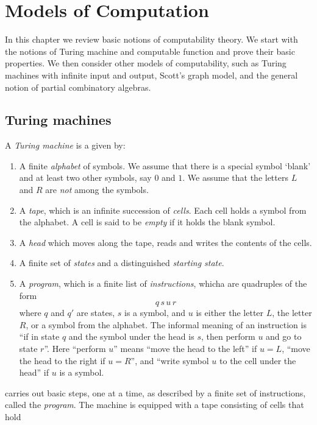 \chapter{Models of Computation\label{cha:models}}


In this chapter we review basic notions of computability theory. We
start with the notions of Turing machine and computable function and
prove their basic properties. We then consider other models of
computability, such as Turing machines with infinite input and output,
Scott's graph model, and the general notion of partial combinatory
algebras.


\section{Turing machines}
\label{sec:turing-machines}

A \emph{Turing machine} is a given by:
%
\begin{enumerate}
\item A finite \emph{alphabet} of symbols. We assume that there is a
  special symbol `blank' and at least two other symbols, say $0$ and
  $1$. We assume that the letters $L$ and $R$ are \emph{not} among the
  symbols.
\item A \emph{tape}, which is an infinite succession of \emph{cells}.
  Each cell holds a symbol from the alphabet. A cell is said to be
  \emph{empty} if it holds the blank symbol.
\item A \emph{head} which moves along the tape, reads and writes
  the contents of the cells.
\item A finite set of \emph{states} and a distinguished \emph{starting
    state}.
\item A \emph{program}, which is a finite list of \emph{instructions},
  whicha are quadruples of the form
  \begin{equation*}
    q \, s \, u \, r
  \end{equation*}
  where $q$ and $q'$ are states, $s$ is a symbol, and $u$ is either
  the letter $L$, the letter $R$, or a symbol from the alphabet. The
  informal meaning of an instruction is ``if in state $q$ and the
  symbol under the head is $s$, then perform $u$ and go to state
  $r$''. Here ``perform $u$'' means ``move the head to the left'' if
  $u = L$, ``move the head to the right if $u = R$'', and ``write
  symbol $u$ to the cell under the head'' if $u$ is a symbol.
\end{enumerate}

 carries out basic steps, one at a time, as described by a
finite set of instructions, called the \emph{program}. The machine is
equipped with a tape consisting of cells that hold


